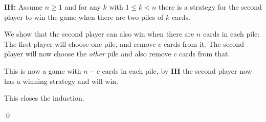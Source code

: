 \documentclass[addpoints]{exam}
\begin{document}
\begin{questions}
\begin{solution}
    \textbf{IH:} Assume $n\geq 1$ and for any $k$ with $1\leq k < n$ there is a
    strategy for the second player to win the game when there are two piles of
    $k$ cards.

    We show that the second player can also win when there are $n$ cards in each
    pile: The first player will choose one pile, and remove $c$ cards from it.
    The second player will now choose the \emph{other} pile and also remove $c$
    cards from that. 

    This is now a game with $n-c$ cards in each pile, by \textbf{IH} the second
    player now has a winning strategy and will win.

    This closes the induction.

    \qed
  \end{solution}
\end{questions}
\end{document}
